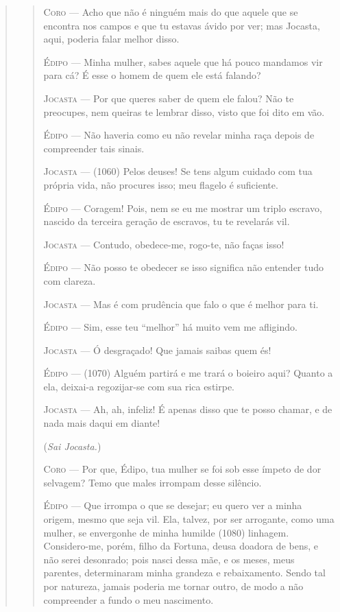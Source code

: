 \begin{verse}
\begin{verse}
\textsc{Coro} --- Acho que não é ninguém mais do que aquele que se encontra nos campos e
que tu estavas ávido por ver; mas Jocasta, aqui, poderia falar melhor
disso.

\textsc{Édipo} --- Minha mulher, sabes aquele que há pouco mandamos vir para cá? É esse o
homem de quem ele está falando?

\textsc{Jocasta} --- Por que queres saber de quem ele falou? Não te preocupes, nem queiras te
lembrar disso, visto que foi dito em vão.

\textsc{Édipo} --- Não haveria como eu não revelar minha raça depois de compreender tais
sinais.

\textsc{Jocasta} --- (1060) Pelos deuses! Se tens algum cuidado com tua própria vida, não
procures isso; meu flagelo é suficiente.

\textsc{Édipo} --- Coragem! Pois, nem se eu me mostrar um triplo escravo, nascido da
terceira geração de escravos, tu te revelarás vil.

\textsc{Jocasta} --- Contudo, obedece-me, rogo-te, não faças isso!

\textsc{Édipo} --- Não posso te obedecer se isso significa não entender tudo com clareza.

\textsc{Jocasta} --- Mas é com prudência que falo o que é melhor para ti.

\textsc{Édipo} --- Sim, esse teu ``melhor'' há muito vem me afligindo.

\textsc{Jocasta} --- Ó desgraçado! Que jamais saibas quem és!

\textsc{Édipo} --- (1070) Alguém partirá e me trará o boieiro aqui? Quanto a ela, deixai-a
regozijar-se com sua rica estirpe.

\textsc{Jocasta} --- Ah, ah, infeliz! É apenas disso que te posso chamar, e de nada mais
daqui em diante!

(\emph{Sai Jocasta.})

\textsc{Coro} --- Por que, Édipo, tua mulher se foi sob esse ímpeto de dor selvagem? Temo
que males irrompam desse silêncio.

\textsc{Édipo} --- Que irrompa o que se desejar; eu quero ver a minha origem, mesmo que
seja vil. Ela, talvez, por ser arrogante, como uma mulher, se envergonhe
de minha humilde (1080) linhagem. Considero-me, porém, filho da Fortuna,
deusa doadora de bens, e não serei desonrado; pois nasci dessa mãe, e os
meses, meus parentes, determinaram minha grandeza e rebaixamento. Sendo
tal por natureza, jamais poderia me tornar outro, de modo a não
compreender a fundo o meu nascimento.


\end{verse}
\end{verse}
